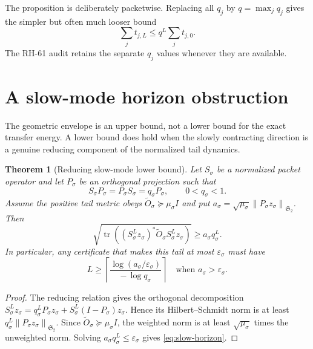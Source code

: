 \documentclass[11pt]{article}
\newtheorem{theorem}{Theorem}[section]
\theoremstyle{remark}
\newcommand{\norm}[1]{\left\lVert#1\right\rVert}
\newcommand{\HS}{\mathfrak S_2}
\newcommand{\tr}{\operatorname{tr}}
\begin{document}
The proposition is deliberately packetwise.  Replacing all $q_j$ by
$q=\max_jq_j$ gives the simpler but often much looser bound
\begin{equation}
 \sum_jt_{j,L}\le q^L\sum_jt_{j,0}.
 \label{eq:common-envelope}
\end{equation}
The RH-61 audit retains the separate $q_j$ values whenever they are
available.

\section{A slow-mode horizon obstruction}
\label{sec:slow-mode}

The geometric envelope is an upper bound, not a lower bound for the exact
transfer energy.  A lower bound does hold when the slowly contracting
direction is a genuine reducing component of the normalized tail dynamics.

\begin{theorem}[Reducing slow-mode lower bound]
\label{thm:slow-mode}
Let $S_\sigma$ be a normalized packet operator and let $P_\sigma$ be an
orthogonal projection such that
\begin{equation}
 S_\sigma P_\sigma=P_\sigma S_\sigma=q_\sigma P_\sigma,
 \qquad 0<q_\sigma<1.
 \label{eq:reducing-mode}
\end{equation}
Assume the positive tail metric obeys
$\widetilde O_\sigma\succeq\mu_\sigma I$ and put
$a_\sigma=\sqrt{\mu_\sigma}\norm{P_\sigma z_\sigma}_{\HS}$.
Then
\begin{equation}
 \sqrt{\tr\!\left((S_\sigma^Lz_\sigma)^*
 \widetilde O_\sigma S_\sigma^Lz_\sigma\right)}
 \ge a_\sigma q_\sigma^L.
 \label{eq:slow-lower}
\end{equation}
In particular, any certificate that makes this tail at most
$\varepsilon_\sigma$ must have
\begin{equation}
 L\ge
 \left\lceil\frac{\log(a_\sigma/\varepsilon_\sigma)}
 {-\,\log q_\sigma}\right\rceil
 \quad\text{when }a_\sigma>\varepsilon_\sigma.
 \label{eq:slow-horizon}
\end{equation}
\end{theorem}

\begin{proof}
The reducing relation gives the orthogonal decomposition
$S_\sigma^Lz_\sigma=q_\sigma^LP_\sigma z_\sigma+
S_\sigma^L(I-P_\sigma)z_\sigma$.  Hence its Hilbert--Schmidt norm is at
least $q_\sigma^L\norm{P_\sigma z_\sigma}_{\HS}$.  Since
$\widetilde O_\sigma\succeq\mu_\sigma I$, the weighted norm is at least
$\sqrt{\mu_\sigma}$ times the unweighted norm.  Solving
$a_\sigma q_\sigma^L\le\varepsilon_\sigma$ gives
\eqref{eq:slow-horizon}.
\end{proof}
\end{document}
